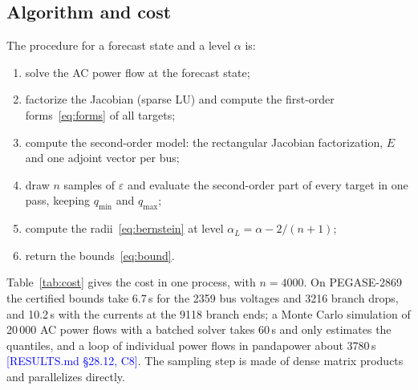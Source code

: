 \documentclass[preprint,12pt]{elsarticle}
\newcommand{\src}[1]{\textcolor{blue}{[#1]}}          %
\begin{document}
\subsection{Algorithm and cost}
The procedure for a forecast state and a level $\alpha$ is:
\begin{enumerate}
\item solve the AC power flow at the forecast state;
\item factorize the Jacobian (sparse LU) and compute the first-order forms~\eqref{eq:forms} of all targets;
\item compute the second-order model: the rectangular Jacobian factorization, $E$ and one adjoint vector per bus;
\item draw $n$ samples of $\varepsilon$ and evaluate the second-order part of every target in one pass, keeping
$q_{\min}$ and $q_{\max}$;
\item compute the radii~\eqref{eq:bernstein} at level $\alpha_L = \alpha - 2/(n+1)$;
\item return the bounds~\eqref{eq:bound}.
\end{enumerate}
Table~\ref{tab:cost} gives the cost in one process, with $n = 4000$. On PEGASE-2869 the certified bounds take
6.7\,s for the 2359 bus voltages and 3216 branch drops, and 10.2\,s with the currents at the 9118 branch ends; a Monte
Carlo simulation of 20\,000 AC power flows with a batched solver takes 60\,s and only estimates the quantiles, and a
loop of individual power flows in pandapower about 3780\,s \src{RESULTS.md §28.12, C8}. The sampling step is made of
dense matrix products and parallelizes directly.

\begin{table}[t]
\centering\small
\caption{Cost of the certified bounds in one process (s), $n = 4000$ samples, median of three runs. ``First order'':
AC point, sparse LU and affine forms. Source: results/b11\_timing.csv.}
\label{tab:cost}
\resizebox{\linewidth}{!}{}
\end{table}
\end{document}
